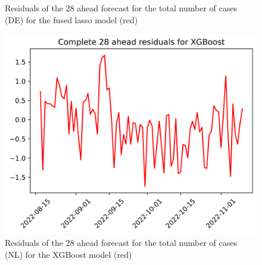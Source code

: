 \begin{figure}
\begin{minipage}{.32\textwidth}
  \caption{Residuals of the 28 ahead forecast for the total number of cases (DE) for the fused lasso model (red)}
  \label{fig:tot_cases_error_28_flasso_DE}
\end{minipage}
\begin{minipage}{.32\textwidth}
  \centering
  \includegraphics[width=\linewidth]{pics/28_ah/28_ahead_errors_XGBoost.png}
  \caption{Residuals of the 28 ahead forecast for the total number of cases (NL) for the XGBoost model (red)}
  \label{fig:tot_cases_error_28_xgb}
\end{minipage}

\end{figure}
